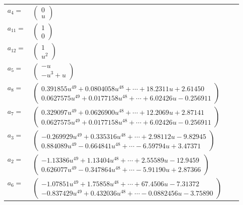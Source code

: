 \documentclass[1p]{elsarticle_modified}
\theoremstyle{definition}
\begin{document}
\begin{tabular}{m{7pt} m{180pt} m{7pt} m{180pt} }
\flushright $a_{4}=$&$\begin{pmatrix}0\\u\end{pmatrix}$ \\
\flushright $a_{11}=$&$\begin{pmatrix}1\\0\end{pmatrix}$ \\
\flushright $a_{12}=$&$\begin{pmatrix}1\\u^2\end{pmatrix}$ \\
\flushright $a_{5}=$&$\begin{pmatrix}- u\\- u^3+u\end{pmatrix}$ \\
\flushright $a_{8}=$&$\begin{pmatrix}0.391855 u^{49}+0.0804058 u^{48}+\cdots+18.2311 u+2.61450\\0.0627575 u^{49}+0.0177158 u^{48}+\cdots+6.02426 u-0.256911\end{pmatrix}$ \\
\flushright $a_{7}=$&$\begin{pmatrix}0.329097 u^{49}+0.0626900 u^{48}+\cdots+12.2069 u+2.87141\\0.0627575 u^{49}+0.0177158 u^{48}+\cdots+6.02426 u-0.256911\end{pmatrix}$ \\
\flushright $a_{3}=$&$\begin{pmatrix}-0.269929 u^{49}+0.335316 u^{48}+\cdots+2.98112 u-9.82945\\0.884089 u^{49}-0.664841 u^{48}+\cdots-6.59794 u+3.47371\end{pmatrix}$ \\
\flushright $a_{2}=$&$\begin{pmatrix}-1.13386 u^{49}+1.13404 u^{48}+\cdots+2.55589 u-12.9459\\0.626077 u^{49}-0.347864 u^{48}+\cdots-5.91190 u+2.87366\end{pmatrix}$ \\
\flushright $a_{6}=$&$\begin{pmatrix}-1.07851 u^{49}+1.75858 u^{48}+\cdots+67.4506 u-7.31372\\-0.837429 u^{49}+0.432036 u^{48}+\cdots-0.0882456 u-3.75890\end{pmatrix}$ \\

\end{tabular}
\end{document}
